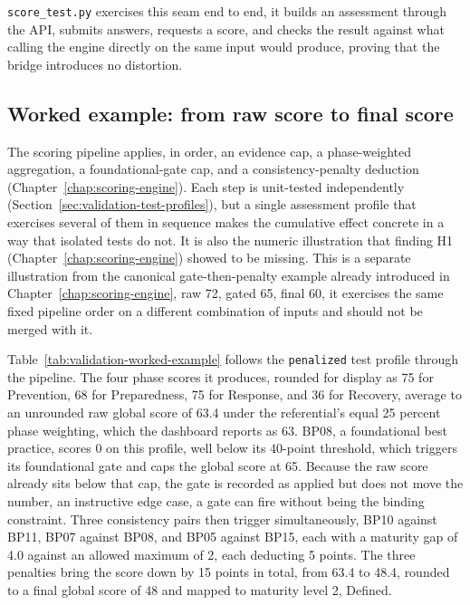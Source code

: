 \texttt{score\_test.py} exercises this seam end to end, it builds an
assessment through the API, submits answers, requests a score, and checks the
result against what calling the engine directly on the same input would
produce, proving that the bridge introduces no distortion.

\subsection{Worked example: from raw score to final score}
\label{sec:validation-worked-example}

The scoring pipeline applies, in order, an evidence cap, a phase-weighted
aggregation, a foundational-gate cap, and a consistency-penalty deduction
(Chapter~\ref{chap:scoring-engine}). Each step is unit-tested independently
(Section~\ref{sec:validation-test-profiles}), but a single assessment
profile that exercises several of them in sequence makes the cumulative
effect concrete in a way that isolated tests do not. It is also the numeric
illustration that finding H1 (Chapter~\ref{chap:scoring-engine}) showed to be
missing. This is a separate
illustration from the canonical gate-then-penalty example already
introduced in Chapter~\ref{chap:scoring-engine}, raw 72, gated 65, final 60,
it exercises the same fixed pipeline order on a different combination of
inputs and should not be merged with it.

Table~\ref{tab:validation-worked-example} follows the \texttt{penalized}
test profile through the pipeline. The four phase scores it produces,
rounded for display as 75 for Prevention, 68 for Preparedness, 75 for
Response, and 36 for Recovery, average to an unrounded raw global score of
63.4 under the referential's equal 25 percent phase weighting, which the
dashboard reports as 63. BP08, a foundational best practice, scores 0 on
this profile, well below its 40-point threshold, which triggers its
foundational gate and caps the global score at 65. Because the raw score
already sits below that cap, the gate is recorded as applied but does not
move the number, an instructive edge case, a gate can fire without being the
binding constraint. Three consistency pairs then trigger simultaneously,
BP10 against BP11, BP07 against BP08, and BP05 against BP15, each with a
maturity gap of 4.0 against an allowed maximum of 2, each deducting 5
points. The three penalties bring the score down by 15 points in total,
from 63.4 to 48.4, rounded to a final global score of 48 and mapped to
maturity level 2, Defined.

